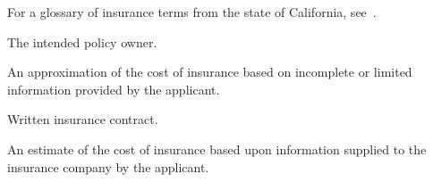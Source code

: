 %
%

For a glossary of insurance terms from the state of California,
see~\cite{gls-ins-calif}.

\begin{description}
  The intended policy owner.

  An approximation of the cost of insurance based on incomplete or limited
  information provided by the applicant.

  Written insurance contract.

  An estimate of the cost of insurance based upon information supplied to the
  insurance company by the applicant.
\end{description}
